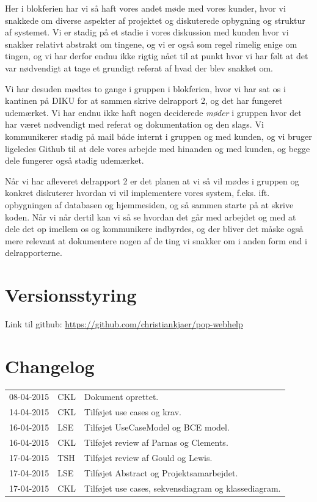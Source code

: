 \documentclass[12pt]{article}
\begin{document}
Her i blokferien har vi så haft vores andet møde med vores kunder, hvor vi snakkede om diverse aspekter af projektet og diskuterede opbygning og struktur af systemet. Vi er stadig på et stadie i vores diskussion med kunden hvor vi snakker relativt abstrakt om tingene, og vi er også som regel rimelig enige om tingen, og vi har derfor endnu ikke rigtig nået til at punkt hvor vi har følt at det var nødvendigt at tage et grundigt referat af hvad der blev snakket om.

Vi har desuden mødtes to gange i gruppen i blokferien, hvor vi har sat os i kantinen på DIKU for at sammen skrive delrapport 2, og det har fungeret udemærket. Vi har endnu ikke haft nogen deciderede \emph{møder} i gruppen hvor det har været nødvendigt med referat og dokumentation og den slags. Vi kommunikerer stadig på mail både internt i gruppen og med kunden, og vi bruger ligeledes Github til at dele vores arbejde med hinanden og med kunden, og begge dele fungerer også stadig udemærket.

Når vi har afleveret delrapport 2 er det planen at vi så vil mødes i gruppen og konkret diskuterer hvordan vi vil implementere vores system, f.eks. ift. opbygningen af databasen og hjemmesiden, og så sammen starte på at skrive koden. Når vi når dertil kan vi så se hvordan det går med arbejdet og med at dele det op imellem os og kommunikere indbyrdes, og der bliver det måske også mere relevant at dokumentere nogen af de ting vi snakker om i anden form end i delrapporterne.

\newpage
\appendix
\section{Versionsstyring}
Link til github: \url{https://github.com/christiankjaer/pop-webhelp}

\section{Changelog}
\begin{tabular}{l l l}
08-04-2015 & CKL & Dokument oprettet. \\
14-04-2015 & CKL & Tilføjet use cases og krav. \\
16-04-2015 & LSE & Tilføjet UseCaseModel og BCE model. \\
16-04-2015 & CKL & Tilføjet review af Parnas og Clements. \\
17-04-2015 & TSH & Tilføjet review af Gould og Lewis. \\
17-04-2015 & LSE & Tilføjet Abstract og Projektsamarbejdet. \\
17-04-2015 & CKL & Tilføjet use cases, sekvensdiagram og klassediagram. \\
\end{tabular}
\end{document}
